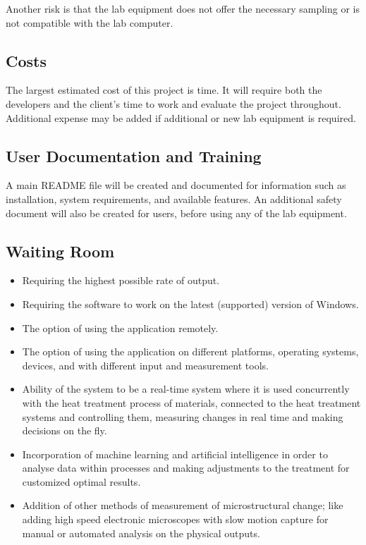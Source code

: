 \documentclass[12pt, titlepage]{article}
\begin{document}
\noindent Another risk is that the lab equipment does not offer the necessary sampling or is not compatible with the lab computer. 

\subsection{Costs}
The largest estimated cost of this project is time. It will require both the developers and the client's time to work and evaluate the project throughout.
Additional expense may be added if additional or new lab equipment is required. 

\subsection{User Documentation and Training}
A main README file will be created and documented for information such as installation, system requirements, and available features. 
An additional safety document will also be created for users, before using any of the lab equipment. 

\subsection{Waiting Room}
\begin{itemize}
    \item Requiring the highest possible rate of output.
    \item Requiring the software to work on the latest (supported) version of Windows.
    \item The option of using the application remotely.
    \item The option of using the application on different platforms, operating systems, devices, and with different input and measurement tools.
    \item Ability of the system to be a real-time system where it is used concurrently with the heat treatment process of materials, connected to the heat treatment systems and controlling them, measuring changes in real time and making decisions on the fly.
    \item Incorporation of machine learning and artificial intelligence in order to analyse data within processes and making adjustments to the treatment for customized optimal results.
    \item Addition of other methods of measurement of microstructural change; like adding high speed electronic microscopes with slow motion capture for manual or automated analysis on the physical outputs.
\end{itemize}
\end{document}
